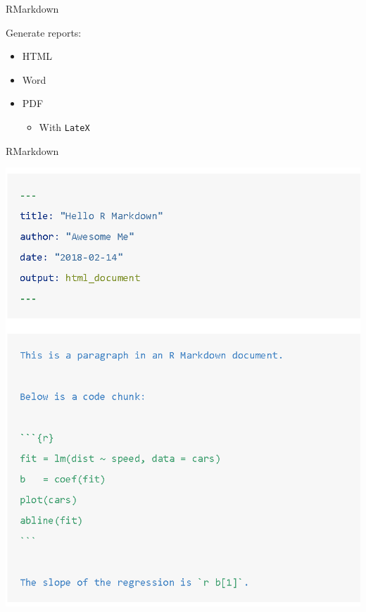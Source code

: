 \documentclass[
  ignorenonframetext,
]{beamer}
\providecommand{\tightlist}{%
  \setlength{\itemsep}{0pt}\setlength{\parskip}{0pt}}
\begin{document}
\begin{frame}[fragile]{RMarkdown}
\protect\hypertarget{rmarkdown-2}{}

Generate reports:

\begin{itemize}[<+->]
\tightlist
\item
  HTML
\item
  Word
\item
  PDF

  \begin{itemize}[<+->]
  \tightlist
  \item
    With \texttt{LateX}
  \end{itemize}
\end{itemize}

\end{frame}

\begin{frame}{RMarkdown}
\protect\hypertarget{rmarkdown-3}{}

\includegraphics{../external/images/min_markdown.PNG}

\end{frame}
\end{document}
